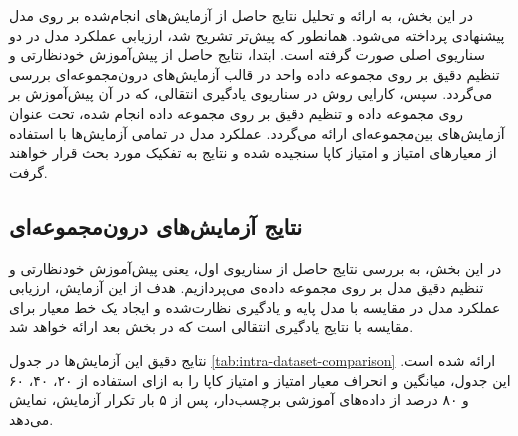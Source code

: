 در این بخش، به ارائه و تحلیل نتایج حاصل از آزمایش‌های انجام‌شده بر روی مدل پیشنهادی پرداخته می‌شود. همانطور که پیش‌تر تشریح شد، ارزیابی عملکرد مدل در دو سناریوی اصلی صورت گرفته است. ابتدا، نتایج حاصل از پیش‌آموزش خودنظارتی و تنظیم دقیق بر روی مجموعه داده واحد 
در قالب آزمایش‌های درون‌مجموعه‌ای بررسی می‌گردد.
سپس، کارایی روش در سناریوی یادگیری انتقالی، که در آن پیش‌آموزش بر روی مجموعه داده 
و تنظیم دقیق بر روی مجموعه داده 
انجام شده، تحت عنوان آزمایش‌های بین‌مجموعه‌ای ارائه می‌گردد.
عملکرد مدل در تمامی آزمایش‌ها با استفاده از معیارهای امتیاز
و امتیاز کاپا سنجیده شده و نتایج به تفکیک مورد بحث قرار خواهند گرفت.

\subsection{نتایج آزمایش‌های درون‌مجموعه‌ای}

در این بخش، به بررسی نتایج حاصل از سناریوی اول، یعنی پیش‌آموزش خودنظارتی و تنظیم دقیق مدل بر روی مجموعه داده‌ی 
می‌پردازیم. هدف از این آزمایش، ارزیابی عملکرد مدل در مقایسه با مدل پایه و یادگیری نظارت‌شده و ایجاد یک خط معیار برای مقایسه با نتایج یادگیری انتقالی است که در بخش بعد ارائه خواهد شد.

نتایج دقیق این آزمایش‌ها در جدول
\ref{tab:intra-dataset-comparison}
ارائه شده است. این جدول، میانگین و انحراف معیار امتیاز
و امتیاز کاپا را به ازای استفاده از ۲۰، ۴۰، ۶۰ و ۸۰ درصد از داده‌های آموزشی برچسب‌دار، پس از ۵ بار تکرار آزمایش، نمایش می‌دهد.

